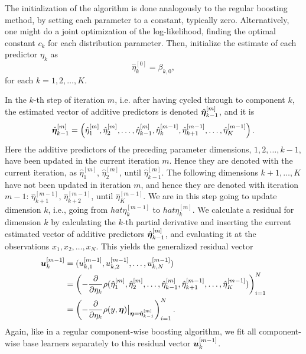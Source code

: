 The initialization of the algorithm is done analogously to the regular boosting method, by setting each parameter to a constant, typically zero.
Alternatively, one might do a joint optimization of the log-likelihood, finding the optimal constant $c_k$ for each distribution parameter.
Then, initialize the estimate of each predictor $\eta_k$ as
\begin{equation}
    \hat{\eta}_k^{[0]}=\beta_{k,0},
\end{equation}
for each $k=1,2,\ldots,K$.

In the $k$-th step of iteration $m$, i.e. after having cycled through to component $k$, the estimated vector of additive predictors is denoted $\hat{\boldsymbol{\eta}}_{k-1}^{[m]}$, and it is
\begin{equation}
    \hat{\boldsymbol{\eta}}_{k-1}^{[m]}=\left(\hat{\eta}_1^{[m]},\hat{\eta}_2^{[m]},\ldots,\hat{\eta}_{k-1}^{[m]},\hat{\eta}_{k}^{[m-1]},\hat{\eta}_{k+1}^{[m-1]},\ldots,\hat{\eta}_{K}^{[m-1]}\right).
\end{equation}
Here the additive predictors of the preceding parameter dimensions, $1,2,\ldots,k-1$, have been updated in the current iteration $m$.
Hence they are denoted with the current iteration, as $\hat{\eta}_1^{[m]}$, $\hat{\eta}_2^{[m]}$, until $\hat{\eta}_{k-1}^{[m]}$.
The following dimensions $k+1,\ldots,K$ have not been updated in iteration $m$, and hence they are denoted with iteration $m-1$:
$\hat{\eta}_{k+1}^{[m-1]}$, $\hat{\eta}_{k+2}^{[m-1]}$, until $\hat{\eta}_{K}^{[m-1]}$.
We are in this step going to update dimension $k$, i.e., going from $hat{\eta}_{k}^{[m-1]}$ to $hat{\eta}_{k}^{[m]}$.
We calculate a residual for dimension $k$ by calculating the $k$-th partial derivative and inserting the current estimated vector of additive predictors $\hat{\boldsymbol{\eta}}_{k-1}^{[m]}$, and evaluating it at the observations $x_1,x_2,\ldots,x_N$.
This yields the generalized residual vector
\begin{align*}
    \bm{u}_k^{[m-1]}&=(u_{k,1}^{[m-1]},u_{k,2}^{[m-1]},\ldots,u_{k,N}^{[m-1]})\\
    &=\left(-\frac{\partial}{\partial \eta_k}\rho(\hat{\eta}_1^{[m]},\hat{\eta}_2^{[m]},\ldots,\hat{\eta}_{k-1}^{[m]},\hat{\eta}_{k+1}^{[m-1]},\ldots,\hat{\eta}_{K}^{[m-1]})\right)_{i=1}^N \\
    &=\left(-\frac{\partial}{\partial \eta_k}\rho(y,\boldsymbol{\eta})\big\rvert_{\boldsymbol{\eta}=\hat{\boldsymbol{\eta}}_{k-1}^{[m]}}\right)_{i=1}^N.
\end{align*}
Again, like in a regular component-wise boosting algorithm, we fit all component-wise base learners separately to this residual vector $\bm{u}_k^{[m-1]}$.
